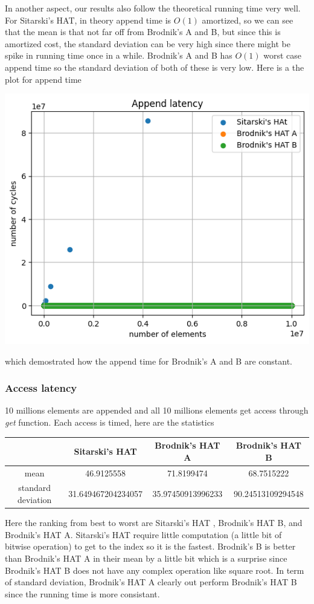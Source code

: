 \documentclass{article} %
\begin{document}
    In another aspect, our results also follow the theoretical running time very well. For Sitarski's HAT, in theory append time is $O(1)$ amortized, so we can see that the mean
    is that not far off from Brodnik's A and B, but since this is amortized cost, the standard deviation can be very high since there might be spike in running time once in a while. Brodnik's A and B has $O(1)$ worst case append time so
    the standard deviation of both of these is very low. Here is a the plot for append time
    \begin{center}
        \includegraphics{graphics/hat_append.png}
    \end{center}
    which demostrated how the append time for Brodnik's A and B are constant.
    \subsubsection*{Access latency}
    10 millions elements are appended and all 10 millions elements get access through \emph{get} function.
    Each access is timed, here are the statistics
    \begin{center}
        \begin{tabular}{|c|c|c|c|}\hline
        & Sitarski's HAT & Brodnik's HAT A & Brodnik's HAT B\\\hline
        mean &  46.9125558 & 71.8199474 & 68.7515222\\\hline
        standard deviation & 31.649467204234057  & 35.97450913996233 & 90.24513109294548\\\hline
        \end{tabular}
    \end{center}
    Here the ranking from best to worst are Sitarski's HAT , Brodnik's HAT B, and Brodnik's HAT A. Sitarski's HAT require little
    computation (a little bit of bitwise operation) to get to the index so it is the fastest. Brodnik's B is better than Brodnik's HAT A in
    their mean by a little bit which is a surprise since Brodnik's HAT B does not have any complex operation like square root. In term of standard deviation,
    Brodnik's HAT A clearly out perform Brodnik's HAT B since the running time is more consistant.
\end{document}
